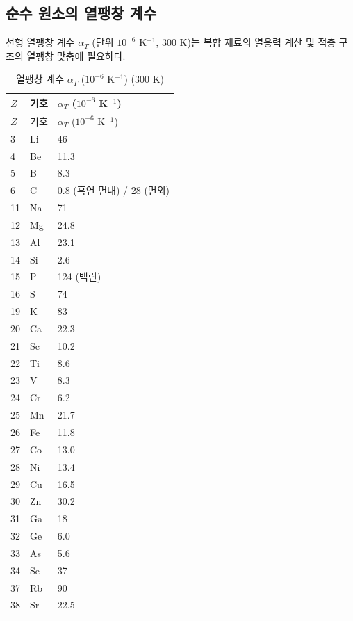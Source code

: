 \documentclass[12pt,a4paper]{article}
\begin{document}
	\subsection{순수 원소의 열팽창 계수}
	\label{subsec:thermal-expansion}
	
	선형 열팽창 계수 \(\alpha_T\) (단위 \(10^{-6}\) K\(^{-1}\), 300 K)는 복합 재료의 열응력 계산 및 적층 구조의 열팽창 맞춤에 필요하다.
	
	\begin{longtable}{p{0.6cm}p{1.2cm}p{1.5cm}}
		\caption{열팽창 계수 \(\alpha_T\) (\(10^{-6}\) K\(^{-1}\)) (300 K)} \label{tab:thermal-expansion-all} \\
		\toprule
		\(Z\) & 기호 & \(\alpha_T\) (\(10^{-6}\) K\(^{-1}\)) \\
		\midrule
		\endfirsthead
		\toprule
		\(Z\) & 기호 & \(\alpha_T\) (\(10^{-6}\) K\(^{-1}\)) \\
		\midrule
		\endhead
		3  & Li & 46 \\
		4  & Be & 11.3 \\
		5  & B  & 8.3 \\
		6  & C  & 0.8 (흑연 면내) / 28 (면외) \\
		11 & Na & 71 \\
		12 & Mg & 24.8 \\
		13 & Al & 23.1 \\
		14 & Si & 2.6 \\
		15 & P  & 124 (백린) \\
		16 & S  & 74 \\
		19 & K  & 83 \\
		20 & Ca & 22.3 \\
		21 & Sc & 10.2 \\
		22 & Ti & 8.6 \\
		23 & V  & 8.3 \\
		24 & Cr & 6.2 \\
		25 & Mn & 21.7 \\
		26 & Fe & 11.8 \\
		27 & Co & 13.0 \\
		28 & Ni & 13.4 \\
		29 & Cu & 16.5 \\
		30 & Zn & 30.2 \\
		31 & Ga & 18 \\
		32 & Ge & 6.0 \\
		33 & As & 5.6 \\
		34 & Se & 37 \\
		37 & Rb & 90 \\
		38 & Sr & 22.5 \\

\end{longtable}
\end{document}
